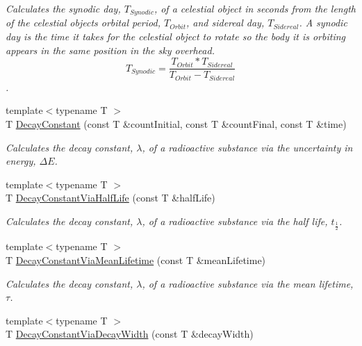 \begin{DoxyCompactItemize}
\begin{DoxyCompactList}\small\item\em Calculates the synodic day, $T_{Synodic}$, of a celestial object in seconds from the length of the celestial object\textquotesingle{}s orbital period, $T_{Orbit}$, and sidereal day, $T_{Sidereal}$. A synodic day is the time it takes for the celestial object to rotate so the body it is orbiting appears in the same position in the sky overhead. \[ T_{Synodic}=\dfrac{T_{Orbit} * T_{Sidereal}}{T_{Orbit} - T_{Sidereal}}\]. \end{DoxyCompactList}\item 
{\footnotesize template$<$typename T $>$ }\\T \mbox{\hyperlink{group___e_g_x_phys-_decay_constant_ga904edce5aad441b4a0873b3b1a83c7f2}{Decay\+Constant}} (const T \&count\+Initial, const T \&count\+Final, const T \&time)
\begin{DoxyCompactList}\small\item\em Calculates the decay constant, $\lambda$, of a radioactive substance via the uncertainty in energy, $\Delta E$. \end{DoxyCompactList}\item 
{\footnotesize template$<$typename T $>$ }\\T \mbox{\hyperlink{group___e_g_x_phys-_decay_constant_ga89c04a655d9e24f976399cc8f173b7aa}{Decay\+Constant\+Via\+Half\+Life}} (const T \&half\+Life)
\begin{DoxyCompactList}\small\item\em Calculates the decay constant, $\lambda$, of a radioactive substance via the half life, $t_{\frac{1}{2}}$. \end{DoxyCompactList}\item 
{\footnotesize template$<$typename T $>$ }\\T \mbox{\hyperlink{group___e_g_x_phys-_decay_constant_ga260cf6dc4f926269ea8966c19dfd269f}{Decay\+Constant\+Via\+Mean\+Lifetime}} (const T \&mean\+Lifetime)
\begin{DoxyCompactList}\small\item\em Calculates the decay constant, $\lambda$, of a radioactive substance via the mean lifetime, $\tau$. \end{DoxyCompactList}\item 
{\footnotesize template$<$typename T $>$ }\\T \mbox{\hyperlink{group___e_g_x_phys-_decay_constant_gac0dc5d8a75657eaa2e939dd243fe4ba8}{Decay\+Constant\+Via\+Decay\+Width}} (const T \&decay\+Width)

\end{DoxyCompactItemize}
